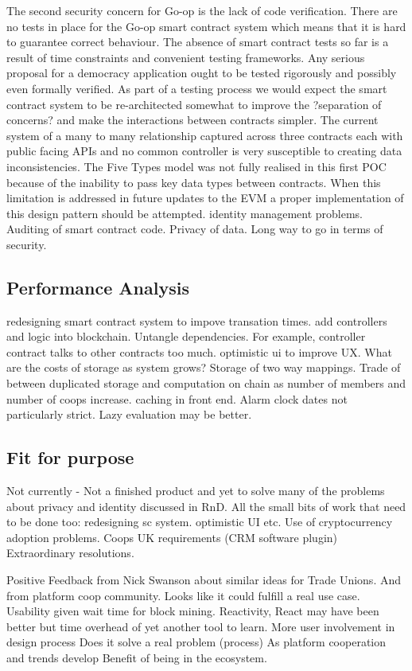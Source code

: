 The second security concern for Go-op is the lack of code verification. There are no tests in place for the Go-op smart contract system which means that it is hard to guarantee correct behaviour. The absence of smart contract tests so far is a result of time constraints and convenient testing frameworks. Any serious proposal for a democracy application ought to be tested rigorously and possibly even formally verified. As part of a testing process we would expect the smart contract system to be re-architected somewhat to improve the ?separation of concerns? and make the interactions between contracts simpler. The current system of a many to many relationship captured across three contracts each with public facing APIs and no common controller is very susceptible to creating data inconsistencies. The Five Types model was not fully realised in this first POC because of the inability to pass key data types between contracts. When this limitation is addressed in future updates to the EVM a proper implementation of this design pattern should be attempted.
identity management problems. Auditing of smart contract code. Privacy of data. Long way to go in terms of security.

\subsection{Performance Analysis}

redesigning smart contract system to impove transation times. add controllers and logic into blockchain.
Untangle dependencies. For example, controller contract talks to other contracts too much. 
optimistic ui to improve UX.
What are the costs of storage as system grows? 
Storage of two way mappings. Trade of between duplicated storage and computation on chain as number of members and number of coops increase.
caching in front end.
Alarm clock dates not particularly strict. Lazy evaluation may be better. 


\subsection{Fit for purpose}

Not currently - Not a finished product and yet to solve many of the problems about privacy and identity discussed in RnD.
All the small bits of work that need to be done too: redesigning sc system. optimistic UI etc.
Use of cryptocurrency adoption problems.
Coops UK requirements (CRM software plugin)
Extraordinary resolutions. 

Positive Feedback from Nick Swanson about similar ideas for Trade Unions. And from platform coop community. Looks like it could fulfill a real use case.
Usability given wait time for block mining. 
Reactivity, React may have been better but time overhead of yet another tool to learn. 
More user involvement in design process
Does it solve a real problem (process)
As platform cooperation and trends develop 
Benefit of being in the ecosystem.

